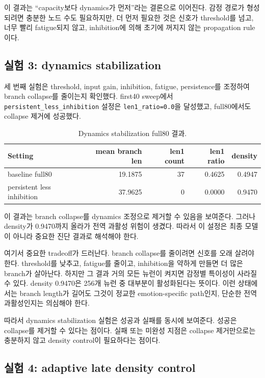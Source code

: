 \documentclass[11pt,a4paper]{article}
\begin{document}
이 결과는 ``capacity보다 dynamics가 먼저''라는 결론으로 이어진다. 감정 경로가 형성되려면 충분한 노드 수도 필요하지만, 더 먼저 필요한 것은 신호가 threshold를 넘고, 너무 빨리 fatigue되지 않고, inhibition에 의해 초기에 꺼지지 않는 propagation rule이다.

\subsection{실험 3: dynamics stabilization}

세 번째 실험은 threshold, input gain, inhibition, fatigue, persistence를 조정하여 branch collapse를 줄이는지 확인했다. first40 sweep에서 \texttt{persistent\_less\_inhibition} 설정은 \texttt{len1\_ratio=0.0}을 달성했고, full80에서도 collapse 제거에 성공했다.

\begin{table}[h]
\centering
\begin{tabular}{lrrrr}
\toprule
Setting & mean branch len & len1 count & len1 ratio & density \\
\midrule
baseline full80 & 19.1875 & 37 & 0.4625 & 0.4947 \\
persistent less inhibition & 37.9625 & 0 & 0.0000 & 0.9470 \\
\bottomrule
\end{tabular}
\caption{Dynamics stabilization full80 결과.}
\label{tab:stabilization}
\end{table}

이 결과는 branch collapse를 dynamics 조정으로 제거할 수 있음을 보여준다. 그러나 density가 0.9470까지 올라가 전역 과활성 위험이 생겼다. 따라서 이 설정은 최종 모델이 아니라 중요한 진단 결과로 해석해야 한다.

여기서 중요한 tradeoff가 드러난다. branch collapse를 줄이려면 신호를 오래 살려야 한다. threshold를 낮추고, fatigue를 줄이고, inhibition을 약하게 만들면 더 많은 branch가 살아난다. 하지만 그 결과 거의 모든 뉴런이 켜지면 감정별 특이성이 사라질 수 있다. density 0.9470은 256개 뉴런 중 대부분이 활성화된다는 뜻이다. 이런 상태에서는 branch length가 길어도 그것이 정교한 emotion-specific path인지, 단순한 전역 과활성인지는 의심해야 한다.

따라서 dynamics stabilization 실험은 성공과 실패를 동시에 보여준다. 성공은 collapse를 제거할 수 있다는 점이다. 실패 또는 미완성 지점은 collapse 제거만으로는 충분하지 않고 density control이 필요하다는 점이다.

\subsection{실험 4: adaptive late density control}
\end{document}
